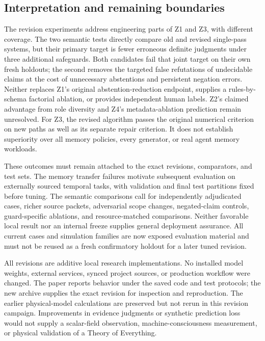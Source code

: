 \subsection{Interpretation and remaining boundaries}
The revision experiments address engineering parts of Z1 and Z3, with different coverage. The two semantic tests directly compare old and revised single-pass systems, but their primary target is fewer erroneous definite judgments under three additional safeguards. Both candidates fail that joint target on their own fresh holdouts; the second removes the targeted false refutations of undecidable claims at the cost of unnecessary abstentions and persistent negation errors. Neither replaces Z1's original abstention-reduction endpoint, supplies a rules-by-schema factorial ablation, or provides independent human labels. Z2's claimed advantage from role diversity and Z4's metadata-ablation prediction remain unresolved. For Z3, the revised algorithm passes the original numerical criterion on new paths as well as its separate repair criterion. It does not establish superiority over all memory policies, every generator, or real agent memory workloads.

These outcomes must remain attached to the exact revisions, comparators, and test sets. The memory transfer failures motivate subsequent evaluation on externally sourced temporal tasks, with validation and final test partitions fixed before tuning. The semantic comparisons call for independently adjudicated cases, richer source packets, adversarial scope changes, negated-claim controls, guard-specific ablations, and resource-matched comparisons. Neither favorable local result nor an internal freeze supplies general deployment assurance. All current cases and simulation families are now exposed evaluation material and must not be reused as a fresh confirmatory holdout for a later tuned revision.

All revisions are additive local research implementations. No installed model weights, external services, synced project sources, or production workflow were changed. The paper reports behavior under the saved code and test protocols; the new archive supplies the exact revision for inspection and reproduction. The earlier physical-model calculations are preserved but not rerun in this revision campaign. Improvements in evidence judgments or synthetic prediction loss would not supply a scalar-field observation, machine-consciousness measurement, or physical validation of a Theory of Everything.
